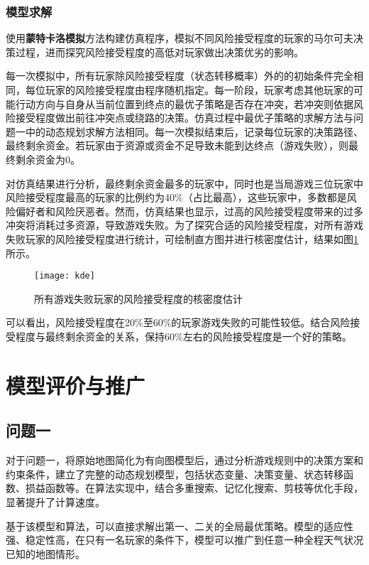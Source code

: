 \documentclass[bwprint]{cumcmthesis} %
\begin{document}
\subsubsection{模型求解}
使用\textbf{蒙特卡洛模拟}方法构建仿真程序，模拟不同风险接受程度的玩家的马尔可夫决策过程，进而探究风险接受程度的高低对玩家做出决策优劣的影响。

每一次模拟中，所有玩家除风险接受程度（状态转移概率）外的的初始条件完全相同，每位玩家的风险接受程度由程序随机指定。每一阶段，玩家考虑其他玩家的可能行动方向与自身从当前位置到终点的最优子策略是否存在冲突，若冲突则依据风险接受程度做出前往冲突点或绕路的决策。仿真过程中最优子策略的求解方法与问题一中的动态规划求解方法相同。每一次模拟结束后，记录每位玩家的决策路径、最终剩余资金。若玩家由于资源或资金不足导致未能到达终点（游戏失败），则最终剩余资金为0。

对仿真结果进行分析，最终剩余资金最多的玩家中，同时也是当局游戏三位玩家中风险接受程度最高的玩家的比例约为40\%（占比最高），这些玩家中，多数都是风险偏好者和风险厌恶者。然而，仿真结果也显示，过高的风险接受程度带来的过多冲突将消耗过多资源，导致游戏失败。为了探究合适的风险接受程度，对所有游戏失败玩家的风险接受程度进行统计，可绘制直方图并进行核密度估计，结果如图\ref{kde}所示。

\begin{figure}[!h]
    \centering
    \texttt{[image: kde]}
    \caption{所有游戏失败玩家的风险接受程度的核密度估计}
    \label{kde}
\end{figure}

可以看出，风险接受程度在20\%至60\%的玩家游戏失败的可能性较低。结合风险接受程度与最终剩余资金的关系，保持60\%左右的风险接受程度是一个好的策略。

\section{模型评价与推广}
\label{sec:simulate}

\subsection{问题一}

对于问题一，将原始地图简化为有向图模型后，通过分析游戏规则中的决策方案和约束条件，建立了完整的动态规划模型，包括状态变量、决策变量、状态转移函数、损益函数等。在算法实现中，结合多重搜索、记忆化搜索、剪枝等优化手段，显著提升了计算速度。

基于该模型和算法，可以直接求解出第一、二关的全局最优策略。模型的适应性强、稳定性高，在只有一名玩家的条件下，模型可以推广到任意一种全程天气状况已知的地图情形。
\end{document}
